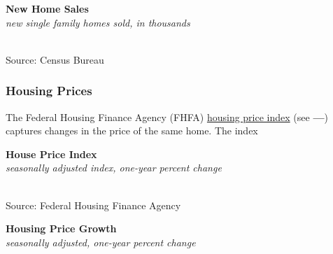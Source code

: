 \documentclass{report}
\makeatletter
\newcommand{\tbllink}[1]{\href{https://raw.githubusercontent.com/bdecon/US-chartbook/master/chartbook/data/#1}{\faTable}}
\newcommand*\short[1]{\expandafter\@gobbletwo\number\numexpr#1\relax}
\newcommand{\dateaxisticks}{
		date coordinates in=x, axis line style={draw=none},
		xmax={2022-01-30},
		max space between ticks=40,	    
		xtick={{1990-01-01}, {1992-01-01}, {1994-01-01}, 
			{1996-01-01}, {1998-01-01}, {2000-01-01}, 
			{2002-01-01}, {2004-01-01}, {2006-01-01},
			{2008-01-01}, {2010-01-01}, {2012-01-01}, {2014-01-01},
		    {2016-01-01}, {2018-01-01}, {2020-01-01}, {2022-01-01}},
		minor xtick={{1989-01-01}, {1991-01-01}, {1993-01-01},
			{1995-01-01}, {1997-01-01}, {1999-01-01}, 
			{2001-01-01}, {2003-01-01}, {2005-01-01}, {2007-01-01},
		    {2009-01-01}, {2011-01-01}, {2013-01-01}, {2015-01-01},
		    {2017-01-01}, {2019-01-01}, {2021-01-01}},
		enlarge y limits={0.06}, enlarge x limits={0.01},
		}
\newcommand{\bbar}[2]{extra #1 ticks = {{#2}}, extra #1 tick labels = ,
		extra #1 tick style = {grid=major, grid style={thick, black!25}},}
\newcommand{\stdline}[4]{\addplot[very thick, no markers, color=#1] 
		table [x=#2, y=#3, col sep=comma] {#4};	}
\newcommand{\thickline}[4]{\addplot[ultra thick, no markers, color=#1] 
		table [x=#2, y=#3, col sep=comma] {#4};	}
\newcommand{\rbars}{
		\fill[color=black!10] (axis cs:{1990-07-01},\pgfkeysvalueof{/pgfplots/ymin}) rectangle 
			(axis cs:{1991-03-01}, \pgfkeysvalueof{/pgfplots/ymax});
		\fill[color=black!10] (axis cs:{2007-12-01},\pgfkeysvalueof{/pgfplots/ymin}) rectangle 
			(axis cs:{2009-07-01}, \pgfkeysvalueof{/pgfplots/ymax});
		\fill[color=black!10] (axis cs:{2001-03-01},\pgfkeysvalueof{/pgfplots/ymin}) rectangle 
			(axis cs:{2001-11-01}, \pgfkeysvalueof{/pgfplots/ymax});
		\fill[color=black!10] (axis cs:{2020-02-01},\pgfkeysvalueof{/pgfplots/ymin}) rectangle 
			(axis cs:{2020-05-01}, \pgfkeysvalueof{/pgfplots/ymax});}
\newcommand{\rebars}{
		\fill[color=black!10] (axis cs:{2007-12-01},\pgfkeysvalueof{/pgfplots/ymin}) rectangle 
			(axis cs:{2009-07-01}, \pgfkeysvalueof{/pgfplots/ymax});
		\fill[color=black!10] (axis cs:{2001-03-01},\pgfkeysvalueof{/pgfplots/ymin}) rectangle 
			(axis cs:{2001-11-01}, \pgfkeysvalueof{/pgfplots/ymax});
		\fill[color=black!10] (axis cs:{2020-02-01},\pgfkeysvalueof{/pgfplots/ymin}) rectangle 
			(axis cs:{2020-05-01}, \pgfkeysvalueof{/pgfplots/ymax});}
\makeatother
\begin{document}
{\begin{minipage}{0.76\textwidth}
\normalsize{\textbf{New Home Sales}}\\
\footnotesize{\textit{new single family homes sold, in thousands}}\\
\hspace*{-2mm} \\
\footnotesize{Source: Census Bureau} \hfill \tbllink{nhs.csv}
\end{minipage}
\newpage
\subsubsection*{\color{black!70} \seriffont Housing Prices}
\begin{minipage}{0.76\textwidth}
\small The Federal Housing Finance Agency (FHFA) \href{https://www.fhfa.gov/DataTools/Downloads/Pages/House-Price-Index-Datasets.aspx}{housing price index} (see {\color{blue!40!cyan}\textbf{---}}) captures changes in the price of the same home. The index 

\normalsize \textbf{House Price Index}\\
\footnotesize{\textit{seasonally adjusted index, one-year percent change}}\\
\hspace*{-2mm} \\
\footnotesize{Source: Federal Housing Finance Agency} \hfill \tbllink{hpi.csv}
\vspace{2mm}

\normalsize{\textbf{Housing Price Growth}}\\
\footnotesize{\textit{seasonally adjusted, one-year percent change}}\\
\hspace*{-3mm} \noindent {} \setlength{\tabcolsep}{3.1pt} \color{black!90}
		{\renewcommand{\arraystretch}{1.5}
		 \begin{tabular}{p{24mm} R{7.1mm} R{7.1mm} R{7.1mm} R{7.1mm} R{7.1mm} R{7.1mm} R{7.1mm} R{12.0mm} R{10.8mm}}
			  \hline
		\end{tabular}}
		

\end{minipage}}
\end{document}

